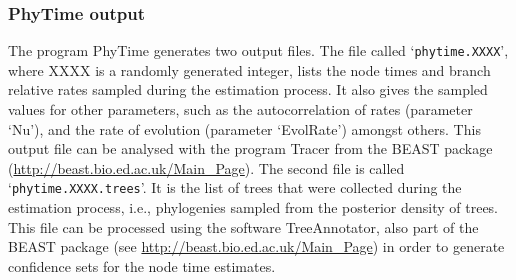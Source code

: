 \documentclass[a4paper,12pt]{article}
\newcommand{\x}[1]{\texttt{#1}}
\begin{document}
\subsubsection{PhyTime output}

The program PhyTime generates two output files.  The file called `\x{phytime.XXXX}', where XXXX is a
randomly generated integer, lists the node times and branch relative rates sampled during the
estimation process.  It also gives the sampled values for other parameters, such as the
autocorrelation of rates (parameter `Nu'), and the rate of evolution (parameter `EvolRate') amongst
others.  This output file can be analysed with the program Tracer from the
BEAST package (\url{http://beast.bio.ed.ac.uk/Main_Page}). The second file is called
`\x{phytime.XXXX.trees}'. It is the list of trees that were collected during the estimation process,
i.e., phylogenies sampled from the posterior density of trees.  This file can be processed using the
software TreeAnnotator, also part of the BEAST package (see
\url{http://beast.bio.ed.ac.uk/Main_Page}) in order to generate confidence sets for the node time
estimates.
\end{document}
